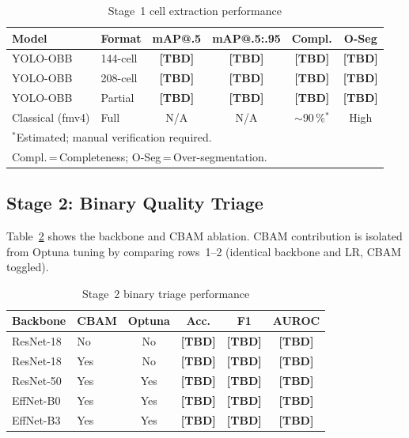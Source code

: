 \documentclass[conference]{IEEEtran}
\begin{document}
\begin{table}[t]
  \caption{Stage~1 cell extraction performance}
  \label{tab:stage1_results}
  \begin{center}
  \renewcommand{\arraystretch}{1.05}
  \small
  \begin{tabular}{llcccc}
    \toprule
    \textbf{Model} & \textbf{Format} &
    \textbf{mAP@.5} & \textbf{mAP@.5:.95} &
    \textbf{Compl.} & \textbf{O-Seg} \\
    \midrule
    YOLO-OBB & 144-cell & \textbf{[TBD]} & \textbf{[TBD]} & \textbf{[TBD]} & \textbf{[TBD]} \\
    YOLO-OBB & 208-cell & \textbf{[TBD]} & \textbf{[TBD]} & \textbf{[TBD]} & \textbf{[TBD]} \\
    YOLO-OBB & Partial  & \textbf{[TBD]} & \textbf{[TBD]} & \textbf{[TBD]} & \textbf{[TBD]} \\
    Classical (fmv4) & Full & N/A & N/A & $\sim$90\,\%$^*$ & High \\
    \bottomrule
    \multicolumn{6}{l}{\footnotesize $^*$Estimated; manual verification required.} \\
    \multicolumn{6}{l}{\footnotesize Compl.\,=\,Completeness; O-Seg\,=\,Over-segmentation.}
  \end{tabular}
  \end{center}
\end{table}

\subsection{Stage 2: Binary Quality Triage}

Table~\ref{tab:stage2_results} shows the backbone and CBAM
ablation. CBAM contribution is isolated from Optuna tuning
by comparing rows~1--2 (identical backbone and LR, CBAM
toggled).

\begin{table}[t]
  \caption{Stage~2 binary triage performance}
  \label{tab:stage2_results}
  \begin{center}
  \renewcommand{\arraystretch}{1.05}
  \small
  \begin{tabular}{llcccc}
    \toprule
    \textbf{Backbone} & \textbf{CBAM} &
    \textbf{Optuna} & \textbf{Acc.} &
    \textbf{F1} & \textbf{AUROC} \\
    \midrule
    ResNet-18  & No  & No  & \textbf{[TBD]} & \textbf{[TBD]} & \textbf{[TBD]} \\
    ResNet-18  & Yes & No  & \textbf{[TBD]} & \textbf{[TBD]} & \textbf{[TBD]} \\
    ResNet-50  & Yes & Yes & \textbf{[TBD]} & \textbf{[TBD]} & \textbf{[TBD]} \\
    EffNet-B0  & Yes & Yes & \textbf{[TBD]} & \textbf{[TBD]} & \textbf{[TBD]} \\
    EffNet-B3  & Yes & Yes & \textbf{[TBD]} & \textbf{[TBD]} & \textbf{[TBD]} \\
    \bottomrule
  \end{tabular}
  \end{center}
\end{table}
\end{document}
